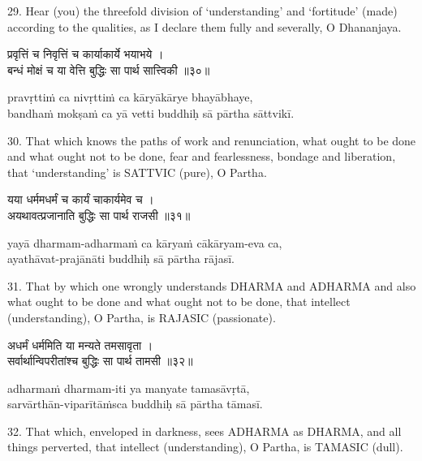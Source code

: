29. Hear (you) the threefold division of `understanding' and `fortitude' (made)
according to the qualities, as I declare them fully and severally, O
Dhananjaya.

\begin{gitaverse}
प्रवृत्तिं च निवृत्तिं च कार्याकार्ये भयाभये । \\
बन्धं मोक्षं च या वेत्ति बुद्धिः सा पार्थ सात्त्विकी ॥३०॥
\end{gitaverse}

\begin{transliteration}
pravṛttiṁ ca nivṛttiṁ ca kāryākārye bhayābhaye, \\
bandhaṁ mokṣaṁ ca yā vetti buddhiḥ sā pārtha sāttvikī.
\end{transliteration}

30. That which knows the paths of work and renunciation, what ought to be done
and what ought not to be done, fear and fearlessness, bondage and liberation,
that `understanding' is SATTVIC (pure), O Partha.

\begin{gitaverse}
यया धर्ममधर्मं च कार्यं चाकार्यमेव च । \\
अयथावत्प्रजानाति बुद्धिः सा पार्थ राजसी ॥३१॥
\end{gitaverse}

\begin{transliteration}
yayā dharmam-adharmaṁ ca kāryaṁ cākāryam-eva ca, \\
ayathāvat-prajānāti buddhiḥ sā pārtha rājasī.
\end{transliteration}

31. That by which one wrongly understands DHARMA and ADHARMA and also what
ought to be done and what ought not to be done, that intellect (understanding),
O Partha, is RAJASIC (passionate).

\begin{gitaverse}
अधर्मं धर्ममिति या मन्यते तमसावृता । \\
सर्वार्थान्विपरीतांश्च बुद्धिः सा पार्थ तामसी ॥३२॥
\end{gitaverse}

\begin{transliteration}
adharmaṁ dharmam-iti ya manyate tamasāvṛtā, \\
sarvārthān-viparītāṁsca buddhiḥ sā pārtha tāmasī.
\end{transliteration}

32. That which, enveloped in darkness, sees ADHARMA as DHARMA, and all things
perverted, that intellect (understanding), O Partha, is TAMASIC (dull).

